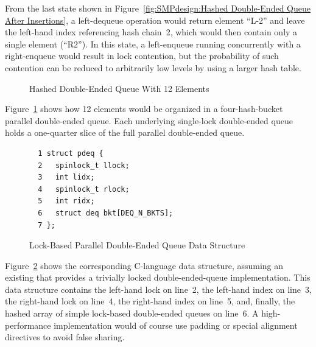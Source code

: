 From the last state shown in
Figure~\ref{fig:SMPdesign:Hashed Double-Ended Queue After Insertions},
a left-dequeue operation would return element ``L-2'' and leave
the left-hand index referencing hash chain~2, which would then
contain only a single element (``R2'').
In this state, a left-enqueue running concurrently with a right-enqueue
would result in lock contention, but the probability of such contention
can be reduced to arbitrarily low levels by using a larger hash table.

\begin{figure}[tb]
\begin{center}
\end{center}
\caption{Hashed Double-Ended Queue With 12 Elements}
\label{fig:SMPdesign:Hashed Double-Ended Queue With 12 Elements}
\end{figure}

Figure~\ref{fig:SMPdesign:Hashed Double-Ended Queue With 12 Elements}
shows how 12 elements would be organized in a four-hash-bucket
parallel double-ended queue.
Each underlying single-lock double-ended queue holds a one-quarter
slice of the full parallel double-ended queue.

\begin{figure}[tbp]
{ \scriptsize
\begin{verbatim}
  1 struct pdeq {
  2   spinlock_t llock;
  3   int lidx;
  4   spinlock_t rlock;
  5   int ridx;
  6   struct deq bkt[DEQ_N_BKTS];
  7 };
\end{verbatim}
}
\caption{Lock-Based Parallel Double-Ended Queue Data Structure}
\label{fig:SMPdesign:Lock-Based Parallel Double-Ended Queue Data Structure}
\end{figure}

Figure~\ref{fig:SMPdesign:Lock-Based Parallel Double-Ended Queue Data Structure}
shows the corresponding C-language data structure, assuming an
existing  that provides a trivially locked
double-ended-queue implementation.
This data structure contains the left-hand lock on line~2,
the left-hand index on line~3, the right-hand lock on line~4,
the right-hand index on line~5, and, finally, the hashed array
of simple lock-based double-ended queues on line~6.
A high-performance implementation would of course use padding or special
alignment directives to avoid false sharing.

